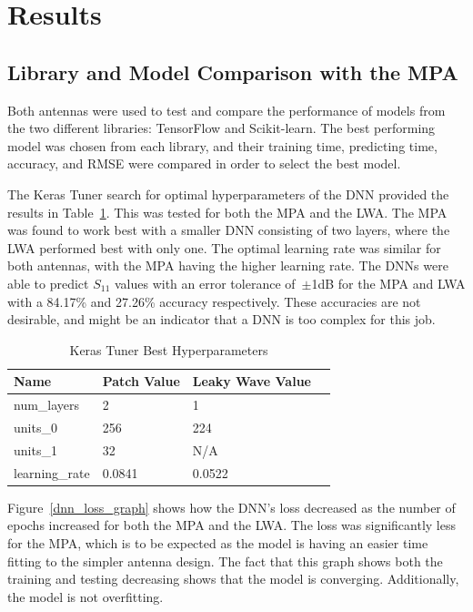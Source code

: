 \documentclass[conference]{IEEEtran}
\begin{document}
\section{Results}
\subsection{Library and Model Comparison with the MPA}
Both antennas were used to test and compare the performance of models from the two different libraries: TensorFlow and Scikit-learn. The best performing model was chosen from each library, and their training time, predicting time, accuracy, and RMSE were compared in order to select the best model.

The Keras Tuner search for optimal hyperparameters of the DNN provided the results in Table~\ref{keras_best_params}. This was tested for both the MPA and the LWA. The MPA was found to work best with a smaller DNN consisting of two layers, where the LWA performed best with only one. The optimal learning rate was similar for both antennas, with the MPA having the higher learning rate. The DNNs were able to predict $S_{11}$ values with an error tolerance of~$\pm$1dB for the MPA and LWA with a 84.17\% and 27.26\% accuracy respectively. These accuracies are not desirable, and might be an indicator that a DNN is too complex for this job.

\begin{table}[h]
\caption{Keras Tuner Best Hyperparameters}
\begin{center}
\begin{tabular}{ |l|l|l|l| }
    \hline
    Name & Patch Value & Leaky Wave Value \\ 
    \hline
    num\_layers & 2 & 1 \\  
    \hline
    units\_0 & 256 & 224 \\
    \hline
    units\_1 & 32 & N/A \\
    \hline
    learning\_rate & 0.0841 & 0.0522 \\
    \hline
\end{tabular}
\end{center}
\label{keras_best_params}
\end{table}

Figure~\ref{dnn_loss_graph} shows how the DNN's loss decreased as the number of epochs increased for both the MPA and the LWA. The loss was significantly less for the MPA, which is to be expected as the model is having an easier time fitting to the simpler antenna design. The fact that this graph shows both the training and testing decreasing shows that the model is converging. Additionally, the model is not overfitting. 
\end{document}
